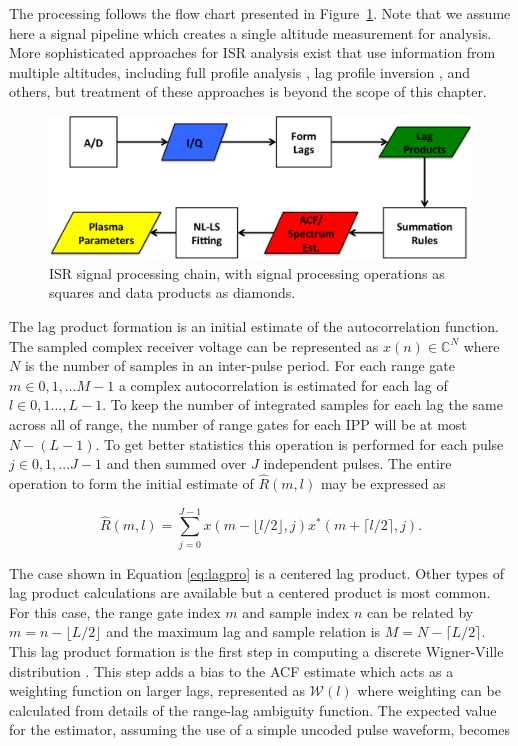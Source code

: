  
The processing follows the flow chart presented in Figure~\ref{fig:chain}.  
Note that we assume here a signal pipeline which creates a single altitude measurement for analysis. 
More sophisticated approaches for ISR analysis exist that use information from multiple altitudes, including full profile analysis \citep{RDS:RDS3308}, lag profile inversion \citep{Virtanen:20082vx}, and others, but treatment of these approaches is beyond the scope of this chapter.
\begin{figure}[!t]
\centering
\includegraphics[width=5.5in]{datastackchain}
\caption{ISR signal processing chain, with signal processing operations as squares and data products as diamonds.}
\label{fig:chain}
\end{figure}
The lag product formation is an initial estimate of the autocorrelation function. The sampled complex receiver voltage can be represented as $x(n) \in\mathbb{C}^N$ where $N$ is the number of samples in an inter-pulse period. For each range gate $m\in 0,1,...M-1$ a complex autocorrelation is estimated for each lag of $l \in 0,1...,L-1$. To keep the number of integrated samples for each lag the same across all of range, the number of range gates for each IPP will be at most $N-(L-1)$. To get better statistics this operation is performed for each pulse $j\in 0,1,...J-1$ and then summed over $J$ independent pulses. The entire operation to form the initial estimate of $\widehat{R}(m,l)$ may be expressed as

\begin{equation}
\label{eq:lagpro}
\widehat{R}(m,l) = \displaystyle\sum\limits_{j=0}^{J-1} x(m-\lfloor l/2\rfloor,j)x^*(m+\lceil l/2 \rceil,j).
\end{equation}

The case shown in Equation \ref{eq:lagpro} is a centered lag product.  Other types of lag product calculations are available but a centered product is most common. For this case, the range gate index $m$ and sample index $n$ can be related by $m=n-\lfloor L/2\rfloor$ and the maximum lag and sample relation is $M=N-\lceil L/2 \rceil$.  This lag product formation is the first step in computing a discrete Wigner-Ville distribution \citep{TFAcohen}. This  step adds a bias to the ACF estimate which acts as a weighting function on larger lags, represented as $\mathcal{W}(l)$ where weighting can be calculated from details of the range-lag ambiguity function. The expected value for the estimator, assuming the use of a simple uncoded pulse waveform, becomes

